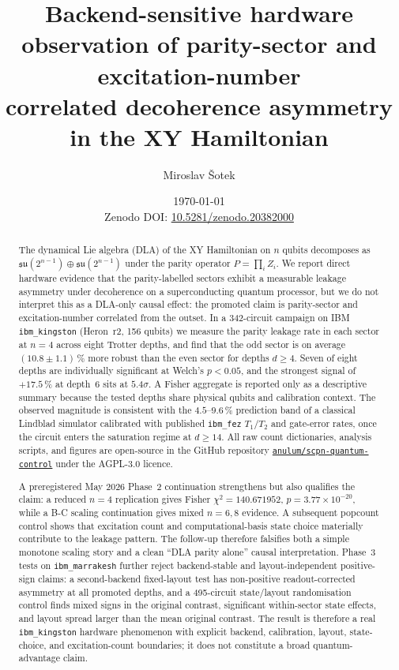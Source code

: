 \documentclass[reprint,aps,physrev,superscriptaddress,floatfix,longbibliography]{revtex4-2}
\newcommand{\paperdoi}{Zenodo DOI: \href{https://doi.org/10.5281/zenodo.20382000}{10.5281/zenodo.20382000}}
\begin{document}
\title{Backend-sensitive hardware observation of parity-sector and excitation-number\\
correlated decoherence asymmetry in the XY Hamiltonian}

\author{Miroslav \v{S}otek}

\date{\today\\\paperdoi}

\begin{abstract}
The dynamical Lie algebra (DLA) of the XY Hamiltonian on $n$ qubits
decomposes as $\mathfrak{su}(2^{n-1}) \oplus \mathfrak{su}(2^{n-1})$
under the parity operator $P = \prod_i Z_i$. We report direct
hardware evidence that the parity-labelled sectors exhibit a
measurable leakage asymmetry under decoherence on a superconducting
quantum processor, but we do not interpret this as a DLA-only causal
effect: the promoted claim is parity-sector and excitation-number
correlated from the outset. In a 342-circuit campaign on IBM
\texttt{ibm\_kingston}
(Heron~r2, 156 qubits) we measure the parity leakage rate in each
sector at $n = 4$ across eight Trotter depths, and find that the odd
sector is on average $(10.8 \pm 1.1)\,\%$ more robust than the even
sector for depths $d \ge 4$. Seven of eight depths are individually
significant at Welch's $p < 0.05$, and the strongest signal of
$+17.5\,\%$ at depth~6 sits at $5.4\sigma$. A Fisher aggregate is
reported only as a descriptive summary because the tested depths share
physical qubits and calibration context. The observed magnitude is consistent
with the $4.5$--$9.6\,\%$ prediction band of a classical Lindblad
simulator calibrated with published \texttt{ibm\_fez} $T_1/T_2$ and
gate-error rates, once the circuit enters the saturation regime at
$d \ge 14$. All raw count dictionaries, analysis scripts, and figures
are open-source in the GitHub repository
\href{https://github.com/anulum/scpn-quantum-control}{\texttt{anulum/scpn-quantum-control}}
under the AGPL-3.0 licence.

A preregistered May 2026 Phase~2 continuation strengthens but also
qualifies the claim: a reduced $n=4$ replication gives Fisher
$\chi^2=140.671952$, $p=3.77\times10^{-20}$, while a B-C scaling
continuation gives mixed $n=6,8$ evidence. A subsequent popcount
control shows that excitation count and computational-basis state
choice materially contribute to the leakage pattern. The follow-up
therefore falsifies both a simple monotone scaling story and a clean
``DLA parity alone'' causal interpretation. Phase~3 tests on
\texttt{ibm\_marrakesh} further reject backend-stable and
layout-independent positive-sign claims: a second-backend fixed-layout
test has non-positive readout-corrected asymmetry at all promoted
depths, and a 495-circuit state/layout randomisation control finds
mixed signs in the original contrast, significant within-sector state
effects, and layout spread larger than the mean original contrast. The
result is therefore a real \texttt{ibm\_kingston} hardware phenomenon
with explicit backend, calibration, layout, state-choice, and
excitation-count boundaries; it does not constitute a broad
quantum-advantage claim.
\end{abstract}
\end{document}
